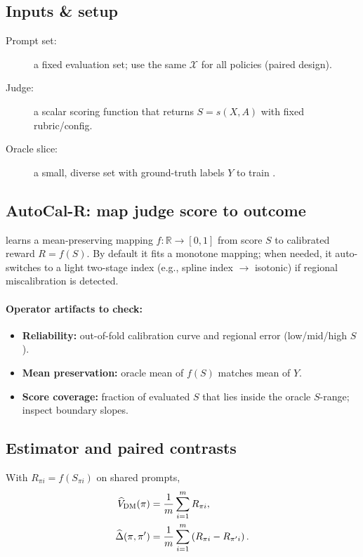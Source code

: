 \subsection{Inputs \& setup}

\begin{description}
\item[Prompt set:] a fixed evaluation set; use the same $\mathcal{X}$ for all policies (paired design).
\item[Judge:] a scalar scoring function that returns $S = s(X, A)$ with fixed rubric/config.
\item[Oracle slice:] a small, diverse set with ground-truth labels $Y$ to train \autocal.
\end{description}

\subsection{AutoCal-R: map judge score to outcome}

\autocal{} learns a mean-preserving mapping $f: \mathbb{R} \to [0,1]$ from score $S$ to calibrated reward $R = f(S)$. By default it fits a monotone mapping; when needed, it auto-switches to a light two-stage index (e.g., spline index $\to$ isotonic) if regional miscalibration is detected.

\paragraph{Operator artifacts to check:}
\begin{itemize}
\item \textbf{Reliability:} out-of-fold calibration curve and regional error (low/mid/high $S$).
\item \textbf{Mean preservation:} oracle mean of $f(S)$ matches mean of $Y$.
\item \textbf{Score coverage:} fraction of evaluated $S$ that lies inside the oracle $S$-range; inspect boundary slopes.
\end{itemize}

\subsection{Estimator and paired contrasts}

With $R_{\pi i} = f(S_{\pi i})$ on shared prompts,
\begin{align}
\widehat{V}_{\text{DM}}(\pi) &= \frac{1}{m} \sum_{i=1}^m R_{\pi i}, \\
\widehat{\Delta}(\pi, \pi') &= \frac{1}{m} \sum_{i=1}^m \left( R_{\pi i} - R_{\pi' i} \right).
\end{align}

